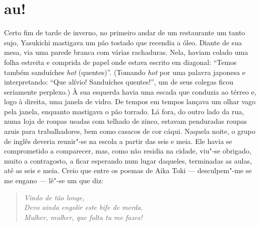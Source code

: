 \section*{au!}

\noindent{}Certo fim de tarde de inverno, no primeiro andar de um restaurante um
tanto sujo, Yasukichi mastigava um pão tostado que recendia a óleo.
Diante de sua mesa, via uma parede branca com várias rachaduras. Nela,
haviam colado uma folha estreita e comprida de papel onde estava
escrito em diagonal: ``Temos também sanduíches \textit{hot} (quentes)''.
(Tomando \textit{hot} por uma palavra japonesa e interpretando: ``Que alívio!
Sanduíches quentes!'', um de seus colegas ficou seriamente perplexo.) À
sua esquerda havia uma escada que conduzia ao térreo e, logo à direita,
uma janela de vidro. De tempos em tempos lançava um olhar vago pela
janela, enquanto mastigava o pão torrado. Lá fora, do outro lado da
rua, numa loja de roupas usadas com telhado de zinco, estavam
penduradas roupas azuis para trabalhadores, bem como casacos de cor
cáqui. Naquela noite, o grupo de inglês deveria reunir"-se na escola a
partir das seis e meia. Ele havia se comprometido a comparecer,
mas, como não residia na cidade, viu"-se obrigado, muito a
contragosto, a ficar esperando num lugar daqueles, terminadas as aulas,
até as seis e meia. Creio que entre os poemas de Aika Toki --- 
desculpem"-me se me engano --- lê"-se um que diz:

\begin{verse}
\textit{Vindo de tão longe,\\
Devo ainda engolir este bife de merda.\\
Mulher, mulher, que falta tu me fazes!}
\end{verse}

